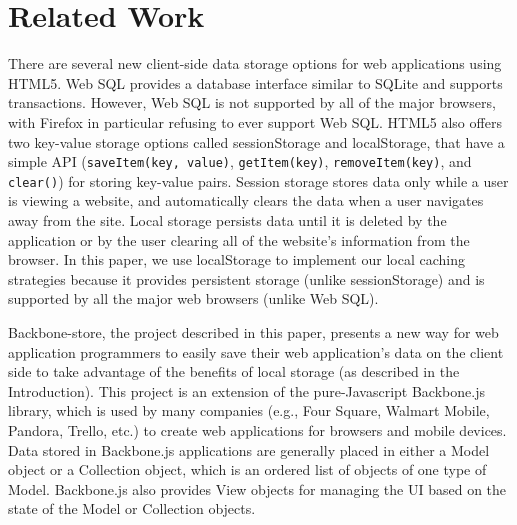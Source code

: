 \documentclass[12pt]{article}
\begin{document}
\section{Related Work}

There are several new client-side data storage options for web applications
using HTML5. Web SQL provides a database interface similar to SQLite and supports
transactions. However, Web SQL is not supported by all of the major browsers,
with Firefox in particular refusing to ever support Web SQL. HTML5 also offers two key-value storage options called sessionStorage and localStorage, that have a simple API (\verb=saveItem(key, value)=, \verb=getItem(key)=,
\verb=removeItem(key)=, and \verb=clear()=) for storing key-value pairs. 
Session storage stores data only while a user is viewing a website, and
automatically clears the data when a user navigates away from the site. Local
storage persists data until it is deleted by the application or by the user
clearing all of the website's information from the browser. In this paper, we use localStorage to implement our local caching strategies because it provides persistent storage (unlike sessionStorage) and is supported by all the major web browsers (unlike Web SQL). 

Backbone-store, the project described in this paper, presents a new way for web
application programmers to easily save their web application's data on the
client side to take advantage of the benefits of local storage (as described in the Introduction). This project is an extension of the pure-Javascript Backbone.js \cite{backbone} library, which is used by many companies (e.g., Four Square, Walmart Mobile, Pandora, Trello, etc.) to create web applications for browsers and mobile devices. Data
stored in Backbone.js applications are generally placed in either a Model
object or a Collection object, which is an ordered list of objects of one type
of Model. Backbone.js also provides View objects for managing the UI based on
the state of the Model or Collection objects.
\end{document}
